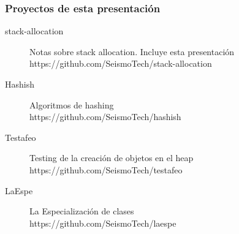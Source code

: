 
\begin{frame}[fragile]
  \frametitle{Proyectos de esta presentación}
  \begin{block}{}
    \begin{description}
    \item[stack-allocation] Notas sobre stack allocation.
      Incluye esta presentación\\
      https://github.com/SeismoTech/stack-allocation

    \item[Hashish] Algoritmos de hashing\\
      https://github.com/SeismoTech/hashish

    \item[Testafeo] Testing de la creación de objetos en el heap\\
      https://github.com/SeismoTech/testafeo

    \item[LaEspe] La Especialización de clases\\
      https://github.com/SeismoTech/laespe
    \end{description}
  \end{block}
\end{frame}
